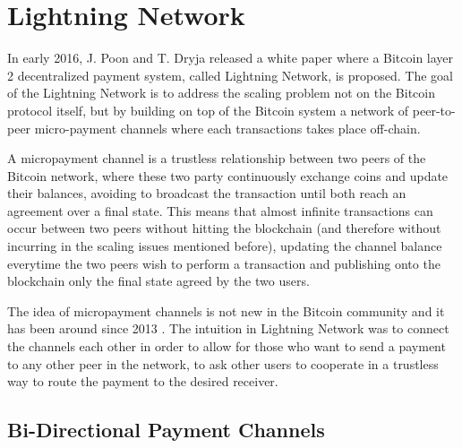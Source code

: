 		\section{Lightning Network}
		
		In early 2016, J. Poon and T. Dryja released a white paper where a Bitcoin layer 2 decentralized payment system, called Lightning Network, is proposed. The goal of the Lightning Network is to address the scaling problem not on the Bitcoin protocol itself, but by building on top of the Bitcoin system a network of peer-to-peer micro-payment channels where each transactions takes place off-chain.
		
		A micropayment channel is a trustless relationship between two peers of the Bitcoin network, where these two party continuously exchange coins and update their balances, avoiding to broadcast the transaction until both reach an agreement over a final state. This means that almost infinite transactions can occur between two peers without hitting the blockchain (and therefore without incurring in the scaling issues mentioned before), updating the channel balance everytime the two peers wish to perform a transaction and publishing onto the blockchain only the final state agreed by the two users.
		
	 The idea of micropayment channels is not new in the Bitcoin community and it has been around since 2013 \cite{micropayments:BitcoinOrg} \cite{Micropayments:Bitcoinj}. The intuition in Lightning Network was to connect the channels each other in order to allow for those who want to send a payment to any other peer in the network, to ask other users to cooperate in a trustless way to route the payment to the desired receiver.
		
		\subsection{Bi-Directional Payment Channels}
		
